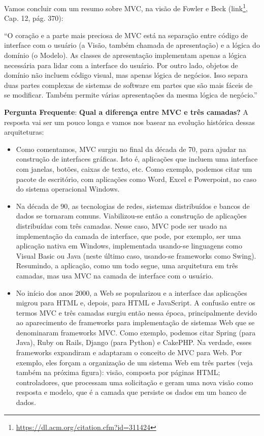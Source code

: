 \documentclass[
  11pt,
  twoside]{book}
\DeclareRobustCommand{\href}[2]{#2\footnote{\url{#1}}}
\renewenvironment{quote}{\centering \vspace{1.5ex} \begin{tcolorbox}[colback=backcolor, width=4.9in]}{\end{tcolorbox}}
\begin{document}
  Vamos concluir com um resumo
sobre MVC, na visão de Fowler e Beck
(\href{https://dl.acm.org/citation.cfm?id=311424}{link}, Cap. 12, pág.
370):

\begin{quote}
``O coração e a parte mais preciosa de MVC está na separação entre
código de interface com o usuário (a Visão, também chamada de
apresentação) e a lógica do domínio (o Modelo). As classes de
apresentação implementam apenas a lógica necessária para lidar com a
interface do usuário. Por outro lado, objetos de domínio não incluem
código visual, mas apenas lógica de negócios. Isso separa duas partes
complexas de sistemas de software em partes que são mais fáceis de se
modificar. Também permite várias apresentações da mesma lógica de
negócio.''
\end{quote}

\textbf{Pergunta Frequente}: \textbf{Qual a diferença entre MVC e três
camadas?} A resposta vai ser um pouco longa e vamos nos basear na
evolução histórica dessas arquiteturas:

\begin{itemize}
\item
  Como comentamos, MVC surgiu no final da década de 70, para ajudar na
  construção de interfaces gráficas. Isto é, aplicações que incluem uma
  interface com janelas, botões, caixas de texto, etc. Como exemplo,
  podemos citar um pacote de escritório, com aplicações como Word, Excel
  e Powerpoint, no caso do sistema operacional Windows.
\item
  Na década de 90, as tecnologias de redes, sistemas distribuídos e
  bancos de dados se tornaram comuns. Viabilizou-se então a construção
  de aplicações distribuídas com três camadas. Nesse caso, MVC pode ser
  usado na implementação da camada de interface, que pode, por exemplo,
  ser uma aplicação nativa em Windows, implementada usando-se linguagens
  como Visual Basic ou Java (neste último caso, usando-se frameworks
  como Swing). Resumindo, a aplicação, como um todo segue, uma
  arquitetura em três camadas, mas usa MVC na camada de interface com o
  usuário.
\item
  No início dos anos 2000, a Web se popularizou e a interface das
  aplicações migrou para HTML e, depois, para HTML e JavaScript. A
  confusão entre os termos MVC e três camadas surgiu então nessa época,
  principalmente devido ao aparecimento de frameworks para implementação
  de sistemas Web que se denominaram frameworks MVC. Como exemplo,
  podemos citar Spring (para Java), Ruby on Rails, Django (para Python)
  e CakePHP.    Na
  verdade, esses frameworks expandiram e adaptaram o conceito de MVC
  para Web. Por exemplo, eles forçam a organização de um sistema Web em
  três partes (veja também na próxima figura): visão, composta por
  páginas HTML; controladores, que processam uma solicitação e geram uma
  nova visão como resposta e modelo, que é a camada que persiste os
  dados em um banco de dados.
\end{itemize}
\end{document}
